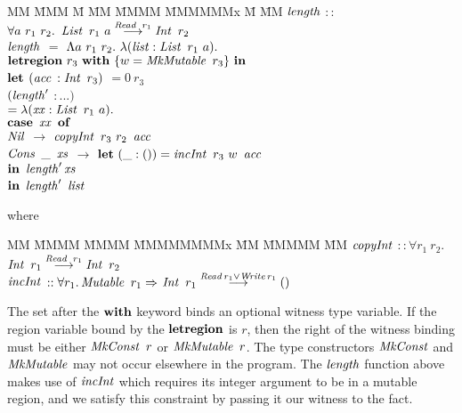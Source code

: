 \begin{tabbing}
MM \= MMM \= M \= MM \= MMMM \= MMMMMMx \= M \= MM \kill
\> $\ilength$ 	\> $::$	\> $\forall a \ r_1 \ r_2. \ \iList \ r_1 \ a \longtoa{\iRead \ r_1} \iInt \ r_2$ \\
\> $\ilength$	\> $=$	\> $\Lambda a \ r_1 \ r_2. \ \lambda (\ilist : \iList \ r_1 \ a).$ \\
\> 		\> 	\> $\kletregion \ r_3 \ \kwith \ \{ w = \iMkMutable \ r_3 \} \ \kin $ \\
\>		\> 	\> $\klet$ 	\> $(\iacc$ 	\> $ : \iInt \ r_3)$	\> $= 0 \ r_3$ \\
\>		\>	\>		\> $(\ilength'$	\> $ : ...)$	\\
\>		\>	\>		\> \quad $= \lambda (\ixx : \iList \ r_1 \ a). $ \\
\>		\>	\>		\> \> $\kcase \ \ixx \ \kof$ \\
\>		\>	\>		\> \> \quad $\iNil$			  \> $\to$ \> $\icopyInt \ r_3 \ r_2 \ \iacc$ \\
\>		\>	\>		\> \> \quad $\iCons \ \_ \ \ixs$ \> $\to$ \> $\klet \ (\_ : ()) = \iincInt \ r_3 \ w \ \iacc$ \\ 
\>		\>	\>		\> \>					  \>	  \> $\kin \ \ilength' \ixs$ \\
\>		\> 	\> $\kin$	\> $\ilength' \ \ilist$
\end{tabbing}
where
\begin{tabbing}
MM \= MMMM \= MMMM \= MMMMMMMMx \= MM \= MMMMM \= MM \kill
\> $\icopyInt$	\> $:: \forall r_1 \ r_2.$ 
		\> $\iInt \ r_1 \longtoa{\iRead \ r_1} \iInt \ r_2$ 
\\
\> $\iincInt$	\> $:: \forall r_1. \iMutable \ r_1 \To$ 	
		$\iInt \ r_1 \longtoa{\iRead r_1 \lor \iWrite r_1} ()$ 
\end{tabbing}
The set after the $\kwith$ keyword binds an optional witness type variable. If the region variable bound by the $\kletregion$ is $r$, then the right of the witness binding must be either $\iMkConst \ r$ or $\iMkMutable \ r$. The type constructors $\iMkConst$ and $\iMkMutable$ may not occur elsewhere in the program. The $\ilength$ function above makes use of $\iincInt$ which requires its integer argument to be in a mutable region, and we satisfy this constraint by passing it our witness to the fact.


